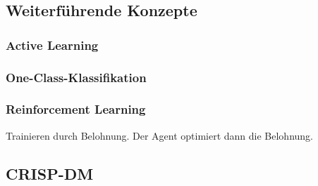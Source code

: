 \documentclass[a4paper]{article}
\begin{document}
\subsection{Weiterführende Konzepte}



\subsubsection{Active Learning}

\subsubsection{One-Class-Klassifikation}

\subsubsection{Reinforcement Learning}

Trainieren durch Belohnung. Der Agent optimiert dann die Belohnung.

\subsection{CRISP-DM}
\end{document}

